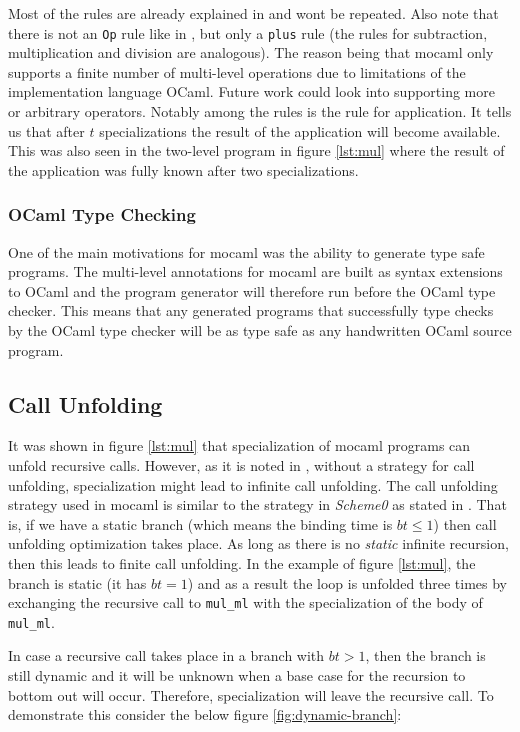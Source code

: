 Most of the rules are already explained in \cite{multilevel} and wont be repeated. Also note that there is not an \texttt{Op} rule like in \cite{multilevel}, but only a \texttt{plus} rule (the rules for subtraction, multiplication and division are analogous). The reason being that mocaml only supports a finite number of multi-level operations due to limitations of the implementation language OCaml. Future work could look into supporting more or arbitrary operators. Notably among the rules is the rule for application. It tells us that after $t$ specializations the result of the application will become available. This was also seen in the two-level program in figure \ref{lst:mul} where the result of the application was fully known after two specializations. %

\subsubsection{OCaml Type Checking}

One of the main motivations for mocaml was the ability to generate type safe programs. The multi-level annotations for mocaml are built as syntax extensions to OCaml and the program generator will therefore run before the OCaml type checker. This means that any generated programs that successfully type checks by the OCaml type checker will be as type safe as any handwritten OCaml source program.

\subsection{Call Unfolding}
It was shown in figure \ref{lst:mul} that specialization of mocaml programs can unfold recursive calls. However, as it is noted in \cite{jones1993chapter5.5}, without a strategy for call unfolding, specialization might lead to infinite call unfolding. The call unfolding strategy used in mocaml is similar to the strategy in \textit{Scheme0} as stated in \cite{jones1993chapter5.5}. That is, if we have a static branch (which means the binding time is $bt \le 1$) then call unfolding optimization takes place. As long as there is no \textit{static} infinite recursion, then this leads to finite call unfolding. In the example of figure \ref{lst:mul}, the branch is static (it has $bt=1$) and as a result the loop is unfolded three times by exchanging the recursive call to \texttt{mul\_ml} with the specialization of the body of \texttt{mul\_ml}.

In case a recursive call takes place in a branch with $bt > 1$, then the branch is still dynamic and it will be unknown when a base case for the recursion to bottom out will occur. Therefore, specialization will leave the recursive call. To demonstrate this consider the below figure \ref{fig:dynamic-branch}:

